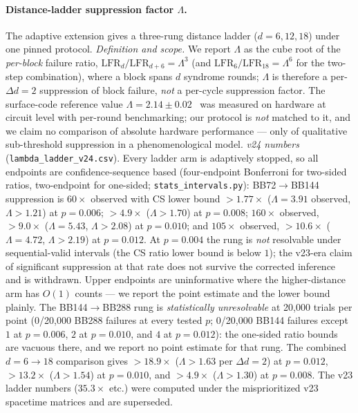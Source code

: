 \documentclass[11pt,a4paper]{article}
\begin{document}
\paragraph{Distance-ladder suppression factor $\Lambda$.}
The adaptive extension gives a three-rung distance ladder
($d=6,12,18$) under one pinned protocol. \emph{Definition and scope.}
We report $\Lambda$ as the cube root of the \emph{per-block} failure
ratio, $\mathrm{LFR}_d/\mathrm{LFR}_{d+6}=\Lambda^3$ (and
$\mathrm{LFR}_6/\mathrm{LFR}_{18}=\Lambda^6$ for the two-step
combination), where a block spans $d$ syndrome rounds; $\Lambda$ is
therefore a per-$\Delta d{=}2$ suppression of block failure, \emph{not}
a per-cycle suppression factor. The surface-code reference value
$\Lambda=2.14\pm0.02$~\cite{Acharya2024lambda} was measured on hardware
at circuit level with per-round benchmarking; our protocol is
\emph{not} matched to it, and we claim no comparison of absolute
hardware performance --- only of qualitative sub-threshold suppression
in a phenomenological model.
\emph{v24 numbers} (\texttt{lambda\_ladder\_v24.csv}). Every ladder arm
is adaptively stopped, so all endpoints are confidence-sequence based
(four-endpoint Bonferroni for two-sided ratios, two-endpoint for
one-sided; \texttt{stats\_intervals.py}): BB72$\to$BB144 suppression is
$60\times$ observed with CS lower bound $>1.77\times$
($\Lambda=3.91$ observed, $\Lambda>1.21$) at $p=0.006$; $>4.9\times$
($\Lambda>1.70$) at $p=0.008$; $160\times$ observed, $>9.0\times$
($\Lambda=5.43$, $\Lambda>2.08$) at $p=0.010$; and $105\times$ observed,
$>10.6\times$ ($\Lambda=4.72$, $\Lambda>2.19$) at $p=0.012$. At
$p=0.004$ the rung is \emph{not} resolvable under sequential-valid
intervals (the CS ratio lower bound is below $1$); the v23-era claim of
significant suppression at that rate does not survive the corrected
inference and is withdrawn. Upper endpoints are uninformative where the
higher-distance arm has $O(1)$ counts --- we report the point estimate
and the lower bound plainly.
The BB144$\to$BB288 rung is \emph{statistically unresolvable} at
20{,}000 trials per point (0/20{,}000 BB288 failures at every tested
$p$; 0/20{,}000 BB144 failures except $1$ at $p=0.006$, $2$ at
$p=0.010$, and $4$ at $p=0.012$): the one-sided ratio bounds are
vacuous there, and we report
no point estimate for that rung. The combined $d=6\to18$ comparison
gives $>18.9\times$ ($\Lambda>1.63$ per $\Delta d{=}2$) at $p=0.012$,
$>13.2\times$ ($\Lambda>1.54$) at $p=0.010$, and
$>4.9\times$ ($\Lambda>1.30$) at $p=0.008$. The v23 ladder numbers
($35.3\times$ etc.) were computed under the misprioritized v23
spacetime matrices and are superseded.
\end{document}
